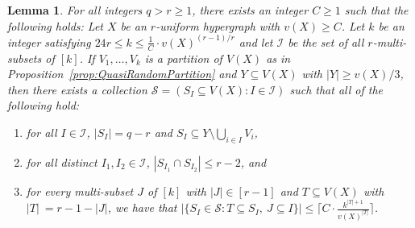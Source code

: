 \documentclass[11pt]{article}
\newcounter{i}
\theoremstyle{plain}
\newtheorem{lem}[thm]{Lemma}
\theoremstyle{plain} %
\theoremstyle{definition}
\begin{document}
\begin{lem}\label{lem:SpecialSets}
For all integers $q>r\ge 1$, there exists an integer $C\ge 1$ such that the following holds: Let $X$ be an $r$-uniform hypergraph with $v(X)\ge C$. Let $k$ be an integer satisfying $24r\le k \le \frac{1}{C}\cdot v(X)^{(r-1)/r}$ and let $\mathcal{I}$ be the set of all $r$-multi-subsets of $[k]$. If $V_1,\ldots,V_k$ is a partition of $V(X)$ as in Proposition~\ref{prop:QuasiRandomPartition} and $Y\subseteq V(X)$ with $|Y|\ge v(X)/3$, then there exists a collection $\mathcal{S} = (S_I \subseteq V(X): I \in \mathcal{I})$ such that all of the following hold:
\begin{enumerate}
    \item[(1)] for all $I\in \mathcal{I}$, $|S_I|=q-r$ and $S_I\subseteq Y\setminus \bigcup_{i\in I} V_i$,
    \item[(2)] for all distinct $I_1, I_2 \in \mathcal{I}$, $|S_{I_1}\cap S_{I_2}| \le r-2$, and
    \item[(3)] for every multi-subset $J$ of $[k]$ with $|J|\in [r-1]$ and $T\subseteq V(X)$ with $|T|\ = r-1-|J|$, we have that $|\{S_I \in \mathcal{S}: T\subseteq S_I,~J\subseteq I\}| \le \lceil C\cdot \frac{k^{|T|+1}}{v(X)^{|T|}} \rceil$.
\end{enumerate}
\end{lem}
\end{document}
